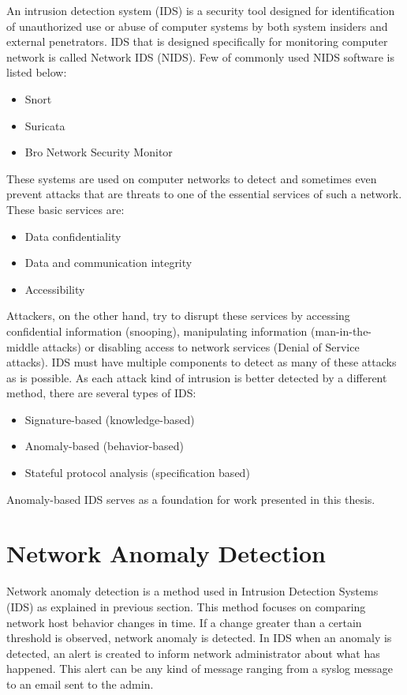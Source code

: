 \documentclass[thesis=B,english]{FITthesis}[2012/10/20]
\begin{document}
An intrusion detection system (IDS) is a security tool designed for identification of unauthorized use or abuse of computer systems by both system insiders and external penetrators\cite{mukherjee1994network}.
IDS that is designed specifically for monitoring computer network is called Network IDS (NIDS).
Few of commonly used NIDS software is listed below:
\begin{itemize}
    \item Snort
    \item Suricata
    \item Bro Network Security Monitor
\end{itemize}
These systems are used on computer networks to detect and sometimes even prevent attacks that are threats to one of the essential services of such a network.
These basic services are\cite{mukherjee1994network}:
\begin{itemize}
    \item Data confidentiality
    \item Data and communication integrity
    \item Accessibility
\end{itemize}
Attackers, on the other hand, try to disrupt these services by accessing confidential information (snooping), manipulating information (man-in-the-middle attacks) or disabling access to network services (Denial of Service attacks).
IDS must have multiple components to detect as many of these attacks as is possible.
As each attack kind of intrusion is better detected by a different method, there are several types of IDS:
\begin{itemize}
    \item Signature-based (knowledge-based) %
    \item Anomaly-based (behavior-based)                                          
    \item Stateful protocol analysis (specification based)
\end{itemize} %
Anomaly-based IDS serves as a foundation for work presented in this thesis.

\section{Network Anomaly Detection}                                               
Network anomaly detection is a method used in Intrusion Detection Systems (IDS) as explained in previous section.
This method focuses on comparing network host behavior changes in time.
If a change greater than a certain threshold is observed, network anomaly is detected.
In IDS when an anomaly is detected, an alert is created to inform network administrator about what has happened.
This alert can be any kind of message ranging from a syslog message to an email sent to the admin. \\ 
\end{document}
